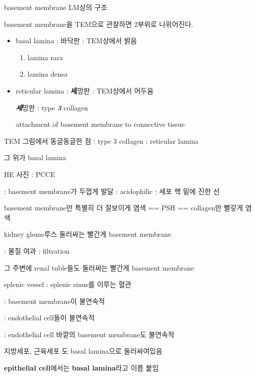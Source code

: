 \documentclass[10pt]{amsart}
\makeatletter
\numberwithin{theorem}{section}
\numberwithin{example}{section}
\theoremstyle{definition}
\theoremstyle{remark}
\renewcommand\subsubsection{\@startsection{subsubsection}{3}%
\z@{.6\linespacing\@plus.7\linespacing}{.4\linespacing}%
{\large\bfseries\color{black}}}
\makeatother
\begin{document}
\subsubsection{basement membrane LM상의 구조}

basement membrane을 TEM으로 관찰하면 2부위로 나위어진다. 


\begin{itemize}
    \item basal lamina : 바닥판 : TEM상에서 밝음 
    
    \begin{enumerate}
        \item lamina rara
        
        \item  lamina densa 
        
    \end{enumerate}
    
    \item reticular lamina : \textbf{세}망판 : TEM상에서 어두움
    
    \textit{\textbf{세}}망판 : type \textit{\textbf{3}} collagen 
    
    attachment of basement membrane to connective tissue
    
\end{itemize}

    TEM 그림에서     동글동글한 점 : type 3 collagen : reticular lamina 
    
    그 위가 basal lamina 
    
    
HE 사진 : PCCE 

: basement membrane가 두껍게 발달 : acidophilic : 세포 핵 밑에 진한 선 


basement membrane만 특별히 더 잘보이게 염색 == PSH == collagen만 빨갛게 염색 

kidney glome루스 둘러싸는 빨간게 basement  membrane

: 물질 여과 :  filtration


그 주변에 renal tuble들도 둘러싸는 빨간게 basement membrane 


splenic vessel : splenic sinus를 이루는 혈관

: basement membrane이 불연속적 

: endothelial cell들이 불연속적 

: endothelial cell 바깥의 basement membrane도 불연속적 

지방세포, 근육세포 도 basal lamina으로 둘러싸여있음 

\textbf{epithelial cell}에서는 \textbf{basal lamina}라고 이름 붙임 
\end{document}
